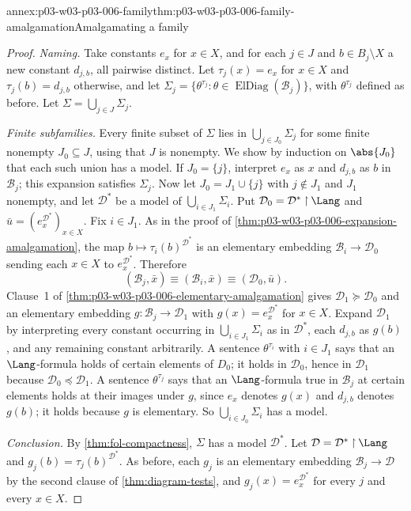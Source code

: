 \begin{annexitem}{annex:p03-w03-p03-006-family}{thm:p03-w03-p03-006-family-amalgamation}{Amalgamating a family}
\begin{proof}
\emph{Naming.}  Take constants \(e_x\) for \(x\in X\), and for each
\(j\in J\) and \(b\in B_j\setminus X\) a new constant \(d_{j,b}\), all
pairwise distinct.  Let \(\tau_j(x)=e_x\) for \(x\in X\) and
\(\tau_j(b)=d_{j,b}\) otherwise, and let
\(\Sigma_j=\{\theta^{\tau_j}:\theta\in\operatorname{ElDiag}(\mathcal B_j)\}\),
with \(\theta^{\tau_j}\) defined as before.  Let
\(\Sigma=\bigcup_{j\in J}\Sigma_j\).

\emph{Finite subfamilies.}  Every finite subset of \(\Sigma\) lies in
\(\bigcup_{j\in J_0}\Sigma_j\) for some finite nonempty \(J_0\subseteq J\),
using that \(J\) is nonempty.  We show by induction on \(\abs{J_0}\) that
each such union has a model.  If \(J_0=\{j\}\), interpret \(e_x\) as \(x\)
and \(d_{j,b}\) as \(b\) in \(\mathcal B_j\); this expansion satisfies
\(\Sigma_j\).  Now let \(J_0=J_1\cup\{j\}\) with \(j\notin J_1\) and
\(J_1\) nonempty, and let \(\mathcal D^*\) be a model of
\(\bigcup_{i\in J_1}\Sigma_i\).  Put
\(\mathcal D_0=\mathcal D^*\mathbin{\upharpoonright}\Lang\) and
\(\bar u=(e_x^{\mathcal D^*})_{x\in X}\).  Fix \(i\in J_1\).  As in the
proof of \cref{thm:p03-w03-p03-006-expansion-amalgamation}, the map
\(b\mapsto\tau_i(b)^{\mathcal D^*}\) is an elementary embedding
\(\mathcal B_i\to\mathcal D_0\) sending each \(x\in X\) to
\(e_x^{\mathcal D^*}\).  Therefore
\[
 (\mathcal B_j,\bar x)\equiv(\mathcal B_i,\bar x)\equiv(\mathcal D_0,\bar u).
\]
Clause~1 of \cref{thm:p03-w03-p03-006-elementary-amalgamation} gives
\(\mathcal D_1\succcurlyeq\mathcal D_0\) and an elementary embedding
\(g:\mathcal B_j\to\mathcal D_1\) with \(g(x)=e_x^{\mathcal D^*}\) for
\(x\in X\).  Expand \(\mathcal D_1\) by interpreting every constant
occurring in \(\bigcup_{i\in J_1}\Sigma_i\) as in \(\mathcal D^*\), each
\(d_{j,b}\) as \(g(b)\), and any remaining constant arbitrarily.  A
sentence \(\theta^{\tau_i}\) with \(i\in J_1\) says that an
\(\Lang\)-formula holds of certain elements of \(D_0\); it holds in
\(\mathcal D_0\), hence in \(\mathcal D_1\) because
\(\mathcal D_0\preccurlyeq\mathcal D_1\).  A sentence \(\theta^{\tau_j}\)
says that an \(\Lang\)-formula true in \(\mathcal B_j\) at certain
elements holds at their images under \(g\), since \(e_x\) denotes
\(g(x)\) and \(d_{j,b}\) denotes \(g(b)\); it holds because \(g\) is
elementary.  So \(\bigcup_{i\in J_0}\Sigma_i\) has a model.

\emph{Conclusion.}  By \cref{thm:fol-compactness}, \(\Sigma\) has a model
\(\mathcal D^*\).  Let \(\mathcal D=\mathcal D^*\mathbin{\upharpoonright}\Lang\)
and \(g_j(b)=\tau_j(b)^{\mathcal D^*}\).  As before, each \(g_j\) is an
elementary embedding \(\mathcal B_j\to\mathcal D\) by the second clause of
\cref{thm:diagram-tests}, and \(g_j(x)=e_x^{\mathcal D^*}\) for every
\(j\) and every \(x\in X\).
\end{proof}
\end{annexitem}

